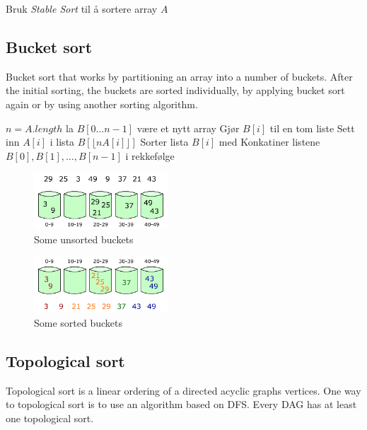 \documentclass[a4paper, 10pt]{article}
\begin{document}
\begin{algorithmic}
\begin{algorithmic}
        \State Bruk \textit{Stable Sort} til å sortere array $A$
\EndFor
\EndFunction 
\end{algorithmic}

\subsection{Bucket sort}
Bucket sort that works by partitioning an array into a number of buckets. After the initial sorting, the buckets are sorted individually, by applying bucket sort again or by using another sorting algorithm.
\\

\begin{algorithmic}
\State $n = A.length$
\State la $B[0 \dots n - 1]$ være et nytt array
        \State Gjør $B[i]$ til en tom liste
\EndFor
{}
        \State Sett inn $A[i]$ i lista $B[ \lfloor nA[i] \rfloor ]$
\EndFor
{}
        \State Sorter lista $B[i]$ med  
\EndFor
\State Konkatiner listene $B[0], B[1], \dots , B[n - 1]$ i rekkefølge
\EndFunction 
\end{algorithmic}

\begin{figure}[hbt]
    \begin{center}
        \includegraphics[width=5cm] {img/unsortedbucket.png}
	\caption{Some unsorted buckets}
    \end{center}
\end{figure}
\begin{figure}[hbt]
    \begin{center}
        \includegraphics[width=5cm] {img/sortedbucket.png}
	\caption{Some sorted buckets}
    \end{center}
\end{figure}
\subsection{Topological sort}
Topological sort is a linear ordering of a directed acyclic graphs vertices. One way to topological sort is to use an algorithm based on DFS. Every DAG has at least one topological sort.
\\


\end{algorithmic}
\end{document}
